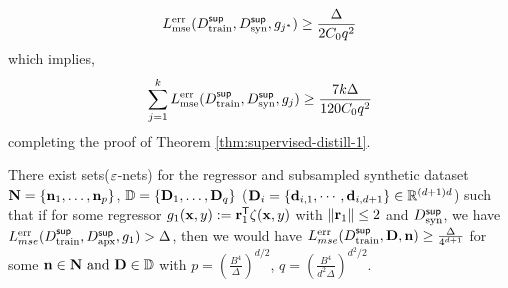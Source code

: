 \begin{equation*}
    L^{\textnormal{err}}_{\textnormal{mse}}(D^{\sf sup}_{\textnormal{train}},D^{\sf sup}_{\textnormal{syn}} , g_{j^*}) \geq \frac{\Delta}{2C_0q^2}
\end{equation*}
which implies,
\begin{equation*}
    \sum_{j=1}^kL^{\textnormal{err}}_{\textnormal{mse}}(D^{\sf sup}_{\textnormal{train}},D^{\sf sup}_{\textnormal{syn}} , g_j) \geq \frac{7 k \Delta}{120 C_0q^2}
\end{equation*}
completing the proof of Theorem \ref{thm:supervised-distill-1}.

\iffalse

\begin{lemma}
    There exist sets(${\varepsilon}$-nets) for the regressor and subsampled synthetic dataset ${\mathbf{N}} =\{{{\mathbf{n}}}_1,\dots,{{\mathbf{n}}}_p\}$,  $\mathbb{D} =\{{{\mathbf{D}}}_1,\dots,{{\mathbf{D}}}_q\}$ (${{\mathbf{D}}}_i = \{{\mathbf{d}}_{i,1}, \cdots, {\mathbf{d}}_{i,d+1} \} \in \mathbb{R}^{(d+1)d}$) such that if for some regressor $g_1({\mathbf{x}}, y) := {\mathbf{r}}_1^{\sf T}\zeta({\mathbf{x}}, y)$ with $ \|{\mathbf{r}}_1\| \leq 2$ and $D^{\sf sup}_{\textnormal{syn}}$, we have $L^{\textnormal{err}}_{mse}(D^{\sf sup}_{\textnormal{train}}, D^{\sf sup}_{\textnormal{apx}}, g_1) > \Delta$, then we would have $L^{\textnormal{err}}_{mse}(D^{\sf sup}_{\textnormal{train}}, {\mathbf{D}}, {\mathbf{n}}) \geq \frac{{\Delta}}{4^{d+1}}$ for some ${{\mathbf{n}}} \in {\ensuremath{\mathbf{N}}} \text{ and } {{\mathbf{D}}} \in \mathbb{D}$ with $p = \left(\frac{B^{4}}{\Delta}\right)^{d/2}$, $q = \left(\frac{B^{4}}{d^2\Delta}\right)^{d^2/2}$.
\end{lemma}

